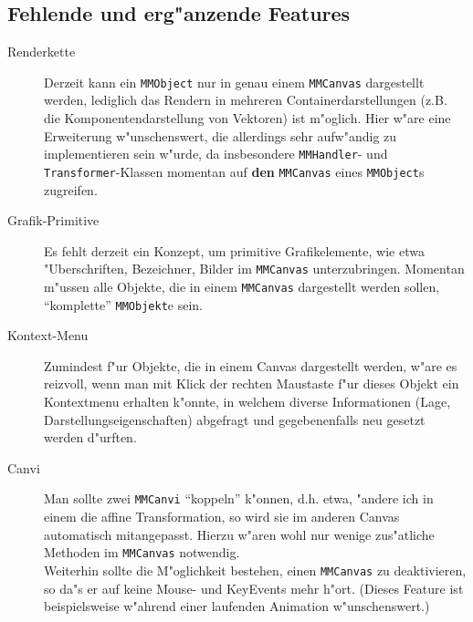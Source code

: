 \documentclass[a4paper,12pt]{article}
\newcommand{\code}[1]{\texttt{#1}}
\begin{document}
\subsection{Fehlende und erg"anzende Features}
\begin{description}

\item [Renderkette]
Derzeit kann ein \code{MMObject} nur in genau einem \code{MMCanvas}
dargestellt werden, lediglich das Rendern in mehreren Containerdarstellungen
(z.B. die Komponentendarstellung von Vektoren) ist m"oglich. Hier w"are eine
Erweiterung w"unschenswert, die allerdings sehr aufw"andig zu implementieren
sein w"urde, da insbesondere \code{MMHandler}- und \code{Transformer}-Klassen
momentan auf \textbf{den} \code{MMCanvas} eines \code{MMObject}s zugreifen.

\item [Grafik-Primitive]
Es fehlt derzeit ein Konzept, um primitive Grafikelemente, wie etwa
"Uberschriften, Bezeichner, Bilder im \code{MMCanvas} unterzubringen.
Momentan m"ussen alle Objekte, die in einem \code{MMCanvas} dargestellt
werden sollen, ``komplette'' \code{MMObjekt}e sein.

\item [Kontext-Menu]
Zumindest f"ur Objekte, die in einem Canvas dargestellt werden, w"are es
reizvoll, wenn man mit Klick der rechten Maustaste f"ur dieses Objekt ein
Kontextmenu erhalten k"onnte, in welchem diverse Informationen (Lage,
Darstellungseigenschaften) abgefragt und gegebenenfalls neu gesetzt werden
d"urften.

\item [Canvi]
Man sollte zwei \code{MMCanvi} ``koppeln'' k"onnen, d.h. etwa, "andere ich in
einem die affine Transformation, so wird sie im anderen Canvas automatisch
mitangepasst. Hierzu w"aren wohl nur wenige zus"atliche Methoden im
\code{MMCanvas} notwendig.\\
Weiterhin sollte die M"oglichkeit bestehen, einen \code{MMCanvas} zu
deaktivieren, so da"s er auf keine Mouse- und KeyEvents mehr h"ort. (Dieses
Feature ist beispielsweise w"ahrend einer laufenden Animation w"unschenswert.)

\end{description}






\end{document}
